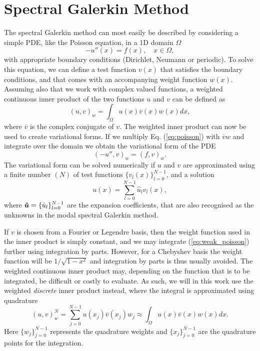 \documentclass[%
oneside,                 %
final,                   %
10pt]{article}
\begin{document}
\section{Spectral Galerkin Method}
\label{sec:preliminaries}
The spectral Galerkin method can most easily be described by considering a simple PDE, like the Poisson equation, in a 1D domain $\Omega$
\begin{equation}
-u''(x) = f(x), \quad x \in \Omega, \label{eq:poisson}
\end{equation}
with appropriate boundary conditions (Dirichlet, Neumann or periodic). To solve this equation, we can define a test function $v(x)$ that satisfies the boundary conditions, and that comes with an accompanying weight function $w(x)$. Assuming also that we work with complex valued functions, a weighted continuous inner product of the two functions $u$ and $v$ can be defined as
\begin{equation}
(u, v)_w = \int_{\Omega} u(x) \overline{v}(x) w(x) dx,
\end{equation}
where $\overline{v}$ is the complex conjugate of $v$. The weighted inner product can now be used to create variational forms. If we multiply Eq. (\ref{eq:poisson}) with $\overline{v}w$ and integrate over the domain we obtain the variational form of the PDE
\begin{equation}
(-u'', v)_w = (f, v)_w. \label{eq:weak_poisson}
\end{equation}
The variational form can be solved numerically if $u$ and $v$ are approximated using a finite number $(N)$ of test functions $\{v_l(x)\}_{l=0}^{N-1}$, and a solution 
\begin{equation}
u(x) = \sum_{l=0}^{N-1} \hat{u}_l v_l(x),
\end{equation}
where $\boldsymbol{\hat{u}} = \{\hat{u}_l\}_{l=0}^{N-1}$ are the expansion coefficients, that are also recognised as the unknowns in the modal spectral Galerkin method.

If $v$ is chosen from a Fourier or Legendre basis, then the weight function used in the inner product is simply constant, and we may integrate (\ref{eq:weak_poisson}) further using integration by parts. However, for a Chebyshev basis the weight function will be $1/\sqrt{1-x^2}$ and integration by parts is thus usually avoided. The weighted continuous inner product may, depending on the function that is to be integrated, be difficult or costly to evaluate. As such, we will in this work use the weighted \emph{discrete} inner product instead, where the integral is approximated using quadrature
\begin{equation}
(u, v)_w^N = \sum_{j=0}^{N-1} u(x_j) \overline{v}(x_j) w_j  \approx  \int_{\Omega} u(x) \overline{v}(x) w(x) dx.
\label{eq:quadrature}
\end{equation}
Here $\{w_j\}_{j=0}^{N-1}$ represents the quadrature weights and $\{x_j\}_{j=0}^{N-1}$ are the quadrature points for the integration. 
\end{document}

